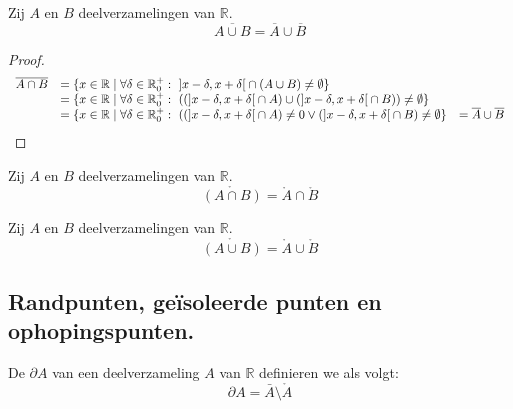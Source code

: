 \documentclass[main.tex]{subfiles}
\begin{document}
\begin{st}
  Zij $A$ en $B$ deelverzamelingen van $\mathbb{R}$.
  \[ \overline{A \cup B} = \overline{A} \cup \overline{B} \]

  \begin{proof}
    \[
    \begin{array}{rll}
      \overline{A \cap B} 
      &= \{ x\in \mathbb{R} \mid \forall \delta \in \mathbb{R}_{0}^{+}:\ \interval[open]{x-\delta}{ x+\delta} \cap (A \cup B) \neq \emptyset \}\\
      &= \{ x\in \mathbb{R} \mid \forall \delta \in \mathbb{R}_{0}^{+}:\ ((\interval[open]{x-\delta}{ x+\delta} \cap A) \cup (\interval[open]{x-\delta}{ x+\delta} \cap B)) \neq \emptyset \}\\
      &= \{ x\in \mathbb{R} \mid \forall \delta \in \mathbb{R}_{0}^{+}:\ ((\interval[open]{x-\delta}{ x+\delta} \cap A) \neq 0 \vee (\interval[open]{x-\delta}{ x+\delta} \cap B) \neq \emptyset \}
      &= \overline{A} \cup \overline{B} \\
    \end{array}
    \]
  \end{proof}
\feed
{}
\end{st}


\begin{st}
  Zij $A$ en $B$ deelverzamelingen van $\mathbb{R}$.
  \[ \mathring{\left(A \cap B\right)} = \mathring{A} \cap \mathring{B} \]

\end{st}

\begin{st}
  Zij $A$ en $B$ deelverzamelingen van $\mathbb{R}$.
  \[ \mathring{\left(A \cup B\right)} = \mathring{A} \cup \mathring{B} \]

\end{st}


\subsection{Randpunten, ge\"isoleerde punten en ophopingspunten.}
\label{sec:randp-geis-punt}

\begin{de}
  De  $\partial A$ van een deelverzameling $A$ van $\mathbb{R}$ definieren we als volgt:
  \[ \partial A = \bar{A} \setminus \mathring{A} \]
\end{de}
\end{document}
